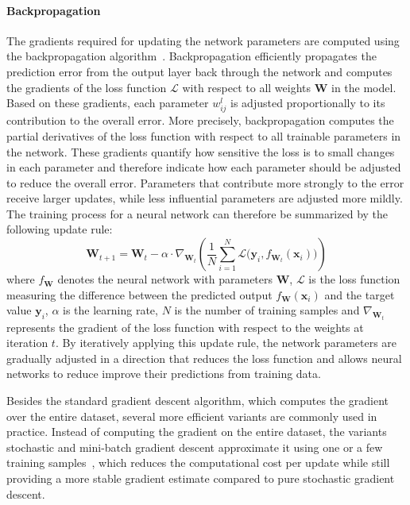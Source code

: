 \paragraph{Backpropagation}
The gradients required for updating the network parameters are computed using the backpropagation algorithm~\cite{Rumelhart1986LearningRB}. Backpropagation efficiently propagates the prediction error from the output layer back through the network and computes the gradients of the loss function $\mathcal{L}$ with respect to all weights $\mathbf{W}$ in the model. Based on these gradients, each parameter $w_{ij}^l$ is adjusted proportionally to its contribution to the overall error.
More precisely, backpropagation computes the partial derivatives of the loss function with respect to all trainable parameters in the network. These gradients quantify how sensitive the loss is to small changes in each parameter and therefore indicate how each parameter should be adjusted to reduce the overall error. Parameters that contribute more strongly to the error receive larger updates, while less influential parameters are adjusted more mildly.
The training process for a neural network can therefore be summarized by the following update rule:
\begin{equation}
\mathbf{W}_{t+1} = \mathbf{W}_t - \alpha \cdot \nabla_{\mathbf{W}_t} \left( \frac{1}{N} \sum_{i=1}^{N} \mathcal{L}\bigl(\mathbf{y}_i, f_{\mathbf{W}_t}(\mathbf{x}_i)\bigr) \right)
\end{equation}
where $f_{\mathbf{W}}$ denotes the neural network with parameters $\mathbf{W}$, $\mathcal{L}$ is the loss function measuring the difference between the predicted output $f_{\mathbf{W}}(\mathbf{x}_i)$ and the target value $\mathbf{y}_i$, $\alpha$ is the learning rate, $N$ is the number of training samples and $\nabla_{\mathbf{W}_t}$ represents the gradient of the loss function with respect to the weights at iteration $t$.
By iteratively applying this update rule, the network parameters are gradually adjusted in a direction that reduces the loss function and allows neural networks to reduce improve their predictions from training data.


Besides the standard gradient descent algorithm, which computes the gradient over the entire dataset, several more efficient variants are commonly used in practice. 
Instead of computing the gradient on the entire dataset, the variants stochastic and mini-batch gradient descent approximate it using one or a few training samples~\cite{Bottou2010LargeScaleML, Robbins1951ASA, Bottou2016OptimizationMF, Goodfellow-et-al-2016}, which reduces the computational cost per update while still providing a more stable gradient estimate compared to pure stochastic gradient descent.





